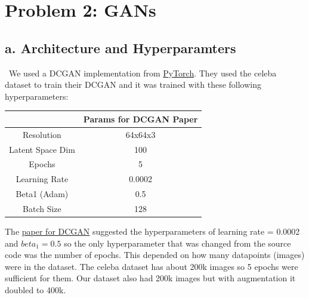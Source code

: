 \documentclass{article}
\begin{document}
\section*{Problem 2: GANs}
\subsection*{a. Architecture and Hyperparamters}
\
We used a DCGAN implementation from \href{https://pytorch.org/tutorials/beginner/dcgan_faces_tutorial.html}{PyTorch}.
They used the celeba dataset to train their DCGAN
and it was trained with these following hyperparameters:
\begin{center}
\begin{tabular}{|c|c|}
\hline
& Params for DCGAN Paper \\ \hline
Resolution & 64x64x3 \\ \hline
Latent Space Dim & 100 \\ \hline
Epochs & 5 \\ \hline
Learning Rate & 0.0002 \\ \hline
Beta1 (Adam) & 0.5 \\ \hline
Batch Size & 128 \\ \hline
\end{tabular}
\end{center}

The \href{https://arxiv.org/pdf/1511.06434.pdf}{paper for DCGAN} suggested the
hyperparameters of learning rate = 0.0002 and $beta_1=0.5$ so
the only hyperparameter that was changed from the source code was the number of epochs.
This depended on how many datapoints (images) were in the dataset. The celeba dataset
has about 200k images so 5 epochs were sufficient for them. Our dataset also had
200k images but with augmentation it doubled to 400k.
\end{document}
